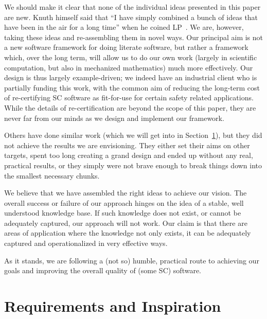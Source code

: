 \documentclass[preprint, 10pt]{sigplanconf}
\begin{document}
We should make it clear that none of the individual ideas presented
in this paper are new.  Knuth himself
said that ``I have simply combined a bunch of ideas that have been in the air
for a long time'' when he coined LP~\cite{Knuth1984}. We are, however, taking these
ideas and re-assembling them in novel ways.  Our principal aim is not a new
software framework for doing literate software, but rather a framework which,
over the long term, will allow us to do our own work (largely in scientific
computation, but also in mechanized mathematics) much more effectively.  Our design
is thus largely example-driven; we indeed have an industrial client who is
partially funding
this work, with the common aim of reducing the long-term cost of re-certifying
SC software as fit-for-use for certain safety related %
applications.  While the details of re-certification are beyond the scope of this paper, they 
are never far from our minds as we design and implement our framework.

Others have done similar work (which we will get into in Section~\ref{sec:bg}),
but they did not achieve the results we are envisioning. They either set their
aims on other targets, spent too long creating a grand design and ended up
without any real, practical results, or they simply were not brave enough to
break things down into the smallest necessary chunks.

We believe that we have assembled the right ideas to achieve our vision.
The overall success or failure of our approach hinges on the idea of a stable,
well understood knowledge base. If such knowledge does not exist, or cannot be
adequately captured, our approach will not work.  Our claim is that there 
are areas of application where the knowledge not only exists, it can be adequately
captured and operationalized in very effective ways.

As it stands, we are following a (not so) humble, practical route to achieving our
goals and improving the overall quality of (some SC) software.


\section{Requirements and Inspiration}
\label{sec:bg}
\end{document}
